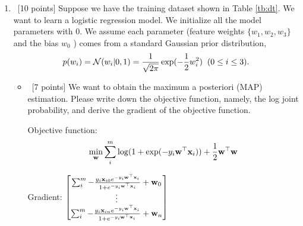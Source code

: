 \documentclass[12pt, fullpage,letterpaper]{article}
\begin{document}
\begin{enumerate}
	$\frac{\partial L}{\partial w^{1}_{02}} = (y-y^*)((w^3_{11})((w^2_{21})(\frac{\partial \sigma}{\partial s}\frac{\partial s}{\partial w^{1}_{02}})) + (w^3_{21})((w^2_{22})(\frac{\partial \sigma}{\partial s}\frac{\partial s}{\partial w^{1}_{02}}))) = (-3.436895)((2)((-3)(((0.99753)(0.00247))(1))+(-1.5)((3)(((0.99753)(0.00247))(1))))) = 0.12702$
	
	$\frac{\partial L}{\partial w^{1}_{12}} = (y-y^*)((w^3_{11})((w^2_{21})(\frac{\partial \sigma}{\partial s}\frac{\partial s}{\partial w^{1}_{12}})) + (w^3_{21})((w^2_{22})(\frac{\partial \sigma}{\partial s}\frac{\partial s}{\partial w^{1}_{12}}))) = (-3.436895)((2)((-3)(((0.99753)(0.00247))(1))+(-1.5)((3)(((0.99753)(0.00247))(1))))) = 0.12702$
	
	$\frac{\partial L}{\partial w^{1}_{22}} = (y-y^*)((w^3_{11})((w^2_{21})(\frac{\partial \sigma}{\partial s}\frac{\partial s}{\partial w^{1}_{22}})) + (w^3_{21})((w^2_{22})(\frac{\partial \sigma}{\partial s}\frac{\partial s}{\partial w^{1}_{22}}))) = (-3.436895)((2)((-3)(((0.99753)(0.00247))(1))+(-1.5)((3)(((0.99753)(0.00247))(1))))) = 0.12702$
	
	\item~[10 points] Suppose we have the training dataset shown in Table \ref{tb:dt}. We want to learn a logistic regression model. We initialize all the model parameters with $0$.  We assume each parameter (\ie feature weights $\{w_1, w_2, w_3\}$ and the bias $w_0$ ) comes from a standard Gaussian prior distribution, 
	\[
	p(w_i) = \mathcal{N}(w_i|0,1) = \frac{1}{\sqrt{2\pi}}\exp(-\frac{1}{2}w_i^2)\;\;(0\le i\le 3).
	\]
	
	\begin{itemize}
		\item~[7 points] We want to obtain the  maximum a posteriori (MAP) estimation. Please write down the objective function, namely, the log joint probability, and derive the gradient of the objective function. 
		
		Objective function: 
		\[
		\min_{{\bf w}} \sum_{i}^{m} \log(1 + \exp(-y_i{\bf w}^\top{\bf x}_i)) + \frac{1}{2} {\bf w}^\top {\bf w}
		\]
		
		Gradient:
		$
		\begin{bmatrix} 
			\sum_{i}^{m} -\frac{y_i{\bf x}_{i0} e^{-y_i{\bf w}^\top{\bf x}_i}}{1+e^{-y_i{\bf w}^\top{\bf x}_i}} + {\bf w}_0 \\
			\vdots \\
			\sum_{i}^{m} -\frac{y_i{\bf x}_{in} e^{-y_i{\bf w}^\top{\bf x}_i}}{1+e^{-y_i{\bf w}^\top{\bf x}_i}} + {\bf w}_n \\
		\end{bmatrix}
		$
		

\end{itemize}
\end{enumerate}
\end{document}
